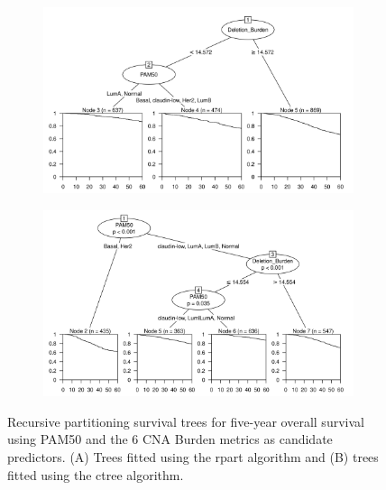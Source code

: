 \begin{figure}[!htb]
\centering

\vspace{0.5cm}

\begin{subfigure}{\textwidth}
\subcaption{}
\includegraphics[width=1\textwidth]{../figures/Appendices/Appendix_B/PartyKit_Survival_Burden_FiveYearOS_PAM50.png}
\end{subfigure}

\vspace{2cm}

\begin{subfigure}{\textwidth}
\subcaption{}
\includegraphics[width=1\textwidth]{../figures/Appendices/Appendix_B/Ctree_Survival_Burden_FiveYearOS_PAM50.png}
\end{subfigure}

\vspace{0.5cm}

\caption[Recursive partitioning survival trees for five-year overall survival using PAM50 and the 6 CNA Burden metrics as candidate predictors.]{Recursive partitioning survival trees for five-year overall survival using PAM50 and the 6 CNA Burden metrics as candidate predictors. (A) Trees fitted using the rpart algorithm and (B) trees fitted using the ctree algorithm.}
\end{figure}

